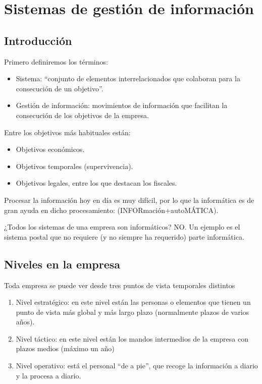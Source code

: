 \documentclass[letterpaper,10pt,spanish]{sphinxmanual}
\begin{document}
\chapter{Sistemas de gestión de información}
\label{tema8:sistemas-de-gestion-de-informacion}\label{tema8::doc}

\section{Introducción}
\label{tema8:introduccion}
Primero definiremos los términos:
\begin{itemize}
\item {} 
Sistema: ``conjunto de elementos interrelacionados que colaboran para la consecución de un objetivo''.

\item {} 
Gestión de información: movimientos de información que facilitan la consecución de los objetivos de la empresa.

\end{itemize}

Entre los objetivos más habituales están:
\begin{itemize}
\item {} 
Objetivos económicos.

\item {} 
Objetivos temporales (supervivencia).

\item {} 
Objetivos legales, entre los que destacan los fiscales.

\end{itemize}

Procesar la información hoy en día es muy difícil, por lo que la informática es de gran ayuda en dicho procesamiento: (INFORmación+autoMÁTICA).

¿Todos los sistemas de una empresa son informáticos? NO. Un ejemplo es el sistema postal que no requiere (y no siempre ha requerido) parte informática.


\section{Niveles en la empresa}
\label{tema8:niveles-en-la-empresa}
Toda empresa se puede ver desde tres puntos de vista temporales distintos
\begin{enumerate}
\item {} 
Nivel estratégico: en este nivel están las personas o elementos que tienen un punto de vista más global y más largo plazo (normalmente plazos de varios años).

\item {} 
Nivel táctico: en este nivel están los mandos intermedios de la empresa con plazos medios (máximo un año)

\item {} 
Nivel operativo: está el personal ``de a pie'', que recoge la información a diario y la procesa a diario.

\end{enumerate}
\end{document}
